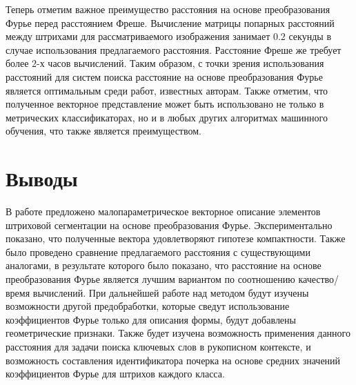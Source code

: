 \documentclass{article}
\begin{document}
Теперь отметим важное преимущество расстояния на основе преобразования Фурье перед расстоянием Фреше. Вычисление матрицы попарных расстояний между штрихами для рассматриваемого изображения занимает $0.2$ секунды в случае использования предлагаемого расстояния. Расстояние Фреше же требует более $2$-х часов вычислений. Таким образом, с точки зрения использования расстояний для систем поиска расстояние на основе преобразования Фурье является оптимальным среди работ, известных авторам. Также отметим, что полученное векторное представление может быть использовано не только в метрических классификаторах, но и в любых других алгоритмах машинного обучения, что также является преимуществом.
\section{Выводы}
В работе предложено малопараметрическое векторное описание элементов штриховой сегментации на основе преобразования Фурье. Экспериментально показано, что полученные вектора удовлетворяют гипотезе компактности. Также было проведено сравнение предлагаемого расстояния с существующими аналогами, в результате которого было показано, что расстояние на основе преобразования Фурье является лучшим вариантом по соотношению качество/время вычислений. При дальнейшей работе над методом будут изучены возможности другой предобработки, которые сведут использование коэффициентов Фурье только для описания формы, будут добавлены геометрические признаки. Также будет изучена возможность применения данного расстояния для задачи поиска ключевых слов в рукописном контексте, и возможность составления идентификатора почерка на основе средних значений коэффициентов Фурье для штрихов каждого класса.







\end{document}
